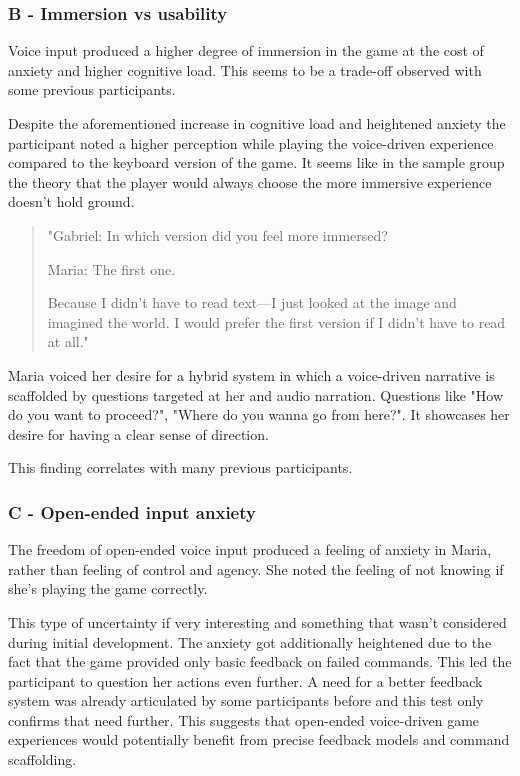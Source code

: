 \subsubsection{B - Immersion vs usability}

Voice input produced a higher degree of immersion in the game at the cost of anxiety and higher cognitive load. This seems to be a trade-off observed with some previous participants.

Despite the aforementioned increase in cognitive load and heightened anxiety the participant noted a higher perception while playing the voice-driven experience compared to the keyboard version of the game. 
It seems like in the sample group the theory that the player would always choose the more immersive experience doesn't hold ground. 


\begin{quote}
    "Gabriel: In which version did you feel more immersed?

    Maria: The first one.

    Because I didn’t have to read text—I just looked at the image and imagined the world.
    I would prefer the first version if I didn’t have to read at all."
\end{quote}

Maria voiced her desire for a hybrid system in which a voice-driven narrative is scaffolded by questions targeted at her and audio narration. Questions like "How do you want to proceed?", "Where do you wanna go from here?". It showcases her desire for having a clear sense of direction. 



This finding correlates with many previous participants.


\subsubsection{C - Open-ended input anxiety}

The freedom of open-ended voice input produced a feeling of anxiety in Maria, rather than feeling of control and agency.
She noted the feeling of not knowing if she's playing the game correctly.

This type of uncertainty if very interesting and something that wasn't considered during initial development. 
The anxiety got additionally heightened due to the fact that the game provided only basic feedback on failed commands. This led the participant to question her actions even further. A need for a better feedback system was already articulated by some participants before and this test only confirms that need further. This suggests that open-ended voice-driven game experiences would potentially benefit from precise feedback models and command scaffolding.


